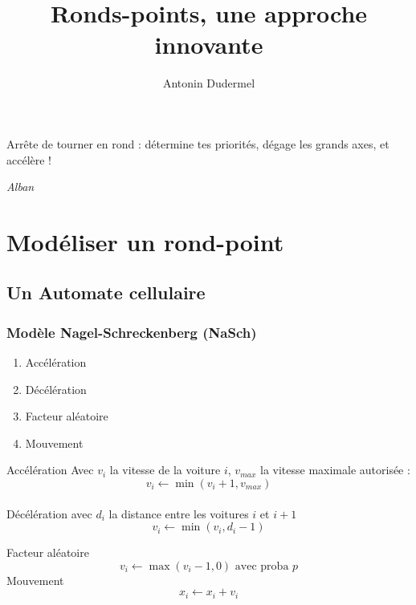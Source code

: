 \documentclass[slidetop,11pt]{beamer}
\title{Ronds-points, une approche innovante}
\date{}
\author{Antonin Dudermel}
\begin{document}

\frame{\titlepage}

\begin{frame}
	\epigraph{Arrête de tourner en rond : détermine tes priorités, dégage les grands axes, et accélère !}{\it Alban}
\end{frame}

\begin{frame}
	\tableofcontents
\end{frame}

\section{Modéliser un rond-point}

	\subsection{Un Automate cellulaire}
		\begin{frame}
	\frametitle{Modèle Nagel-Schreckenberg (NaSch)}
	\begin{enumerate}
		\item Accélération 
		\item Décélération
		\item Facteur aléatoire
		\item Mouvement
	\end{enumerate}
\end{frame}

\begin{frame}
Accélération
	Avec $v_i$ la vitesse de la voiture $i$, $v_{max}$ la vitesse maximale autorisée : 
	\begin{equation}
		v_i \leftarrow \min (v_i+1,v_{max})
	\end{equation}
\\

Décélération
	avec $d_i$ la distance entre les voitures $i$ et $i+1$
	\begin{equation}
		v_i \leftarrow \min (v_i,d_i-1)
	\end{equation}


Facteur aléatoire
	\begin{equation}
		v_i \leftarrow \max(v_i-1,0) \text{ avec proba } p
	\end{equation}
	Mouvement
	\begin{equation}
		x_i \leftarrow x_i + v_i
	\end{equation}
\end{frame}
\end{document}
